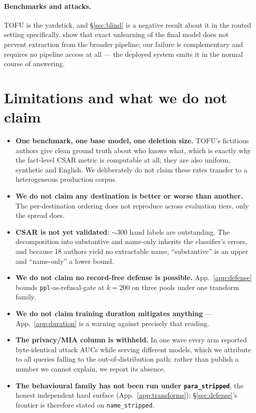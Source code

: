 \documentclass{article}
\newcommand{\csar}{CSAR}
\begin{document}
\paragraph{Benchmarks and attacks.} TOFU \citep{maini2024tofu} is the yardstick, and
\S\ref{sec:blind} is a negative result about it in the routed setting specifically.
\citet{wu2025unlearned} show that exact unlearning of the final model does not prevent extraction
from the broader pipeline; our failure is complementary and requires no pipeline access at all ---
the deployed system emits it in the normal course of answering.

\section{Limitations and what we do not claim}
\label{app:limits}

\begin{itemize}
  \item \textbf{One benchmark, one base model, one deletion size.} TOFU's fictitious authors give
        clean ground truth about who knows what, which is exactly why the fact-level \csar{} metric
        is computable at all; they are also uniform, synthetic and English. We deliberately do not
        claim these rates transfer to a heterogeneous production corpus.
  \item \textbf{We do not claim any destination is better or worse than another.} The
        per-destination ordering does not reproduce across evaluation tiers, only the spread does.
  \item \textbf{\csar{} is not yet validated}: ${\sim}300$ hand labels are outstanding. The
        decomposition into substantive and name-only inherits the classifier's errors, and because
        18 authors yield no extractable name, ``substantive'' is an upper and ``name-only'' a lower
        bound.
  \item \textbf{We do not claim no record-free defense is possible.} App.~\ref{app:defense} bounds
        \texttt{ppl}-as-refusal-gate at $k=200$ on three pools under one transform family.
  \item \textbf{We do not claim training duration mitigates anything} --- App.~\ref{app:duration}
        is a warning against precisely that reading.
  \item \textbf{The privacy/MIA column is withheld.} In one wave every arm reported byte-identical
        attack AUCs while serving different models, which we attribute to all queries falling to
        the out-of-distribution path; rather than publish a number we cannot explain, we report its
        absence.
  \item \textbf{The behavioural family has not been run under \texttt{para\_stripped}}, the honest
        independent hard surface (App.~\ref{app:transforms}); \S\ref{sec:defense}'s frontier is
        therefore stated on \texttt{name\_stripped}.
\end{itemize}
\end{document}
